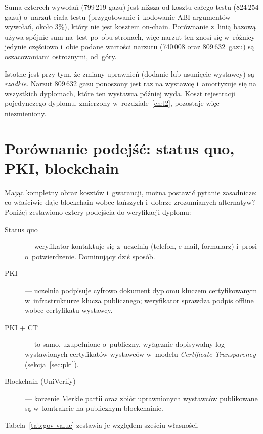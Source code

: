 Suma czterech wywołań (799\,219 gazu) jest niższa od kosztu całego testu
(824\,254 gazu) o~narzut ciała testu (przygotowanie i~kodowanie ABI
argumentów wywołań, około 3\%), który nie jest kosztem on-chain. Porównanie
z~linią bazową używa spójnie sum na~test po~obu stronach, więc narzut ten
znosi się w~różnicy jedynie częściowo i~obie podane wartości narzutu
(740\,008 oraz 809\,632~gazu) są oszacowaniami ostrożnymi, od~góry.

Istotne jest przy tym, że zmiany uprawnień (dodanie lub usunięcie wystawcy) są
\emph{rzadkie}. Narzut 809\,632 gazu ponoszony jest raz na wystawcę i~amortyzuje się
na wszystkich dyplomach, które ten wystawca później wyda. Koszt rejestracji
pojedynczego dyplomu, zmierzony w~rozdziale~\ref{ch:l2}, pozostaje więc
niezmieniony.

\section{Porównanie podejść: status quo, PKI, blockchain}
\label{sec:gov-porownanie}

Mając kompletny obraz kosztów i~gwarancji, można postawić pytanie zasadnicze: co
właściwie daje blockchain wobec tańszych i~dobrze zrozumianych alternatyw?
Poniżej zestawiono cztery podejścia do weryfikacji dyplomu:

\begin{description}
  \item[Status quo] --- weryfikator kontaktuje się z~uczelnią (telefon, e-mail,
        formularz) i~prosi o~potwierdzenie. Dominujący dziś sposób.
  \item[PKI] --- uczelnia podpisuje cyfrowo dokument dyplomu kluczem
        certyfikowanym w~infrastrukturze klucza publicznego; weryfikator sprawdza
        podpis offline wobec certyfikatu wystawcy.
  \item[PKI + CT] --- to samo, uzupełnione o~publiczny, wyłącznie dopisywalny
        log wystawionych certyfikatów wystawców w~modelu \emph{Certificate
        Transparency}~\cite{rfc6962} (sekcja~\ref{sec:pki}).
  \item[Blockchain (UniVerify)] --- korzenie Merkle partii oraz zbiór uprawnionych
        wystawców publikowane są w~kontrakcie na publicznym blockchainie.
\end{description}

Tabela~\ref{tab:gov-value} zestawia je względem sześciu własności.

